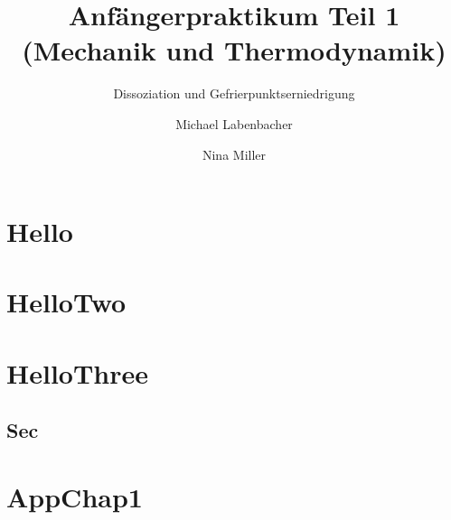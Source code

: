 \documentclass[fontsize=11pt, twoside=false, headings=openany, paper=a4, paper=portrait, twocolumn=false, footinclude=false, headinclude=false, mpinclude=false, pagesize=auto, DIV=12, BCOR=0mm, headlines=1.25, footlines=1.25, parskip=false, headings=small, numbers=enddot, chapterprefix=false, appendixprefix=false, listof=indented, toc=indented, toc=listofnumbered, toc=bibliographynumbered]{scrreprt}%
\begin{document}
\nomatter
{}
\title{Anfängerpraktikum Teil 1 \\\medskip \LARGE{(Mechanik und Thermodynamik)}}%
\subtitle{Dissoziation und Gefrierpunktserniedrigung}%
\author{Michael Labenbacher \and{} Nina Miller}%
\maketitle
\frontmatter
\mainmatter

\chapter{Hello}
\chapter{HelloTwo}\newpage
\chapter{HelloThree}
\section{Sec}
\cite{AnleitungVIS}

\appendix%
\chapter{AppChap1}


\TUMstartlo%
\TUMlistofbibliographies%
\TUMlistoffigures%
\TUMlistoftables%

\backmatter
\end{document}
